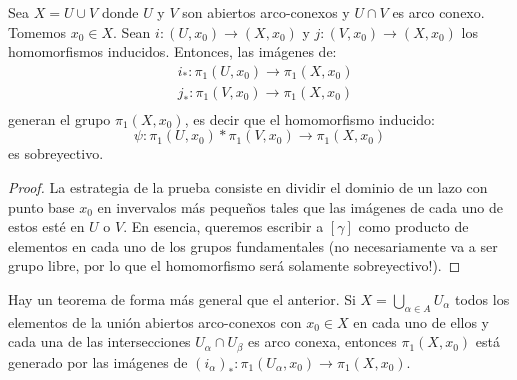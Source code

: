 \documentclass[12pt]{report}
\newcounter{it}
\theoremstyle{largebreak}
\newcommand\cf[3]{\ensuremath{#1:#2\rightarrow#3}}
\begin{document}
    \begin{propo}
        Sea $X=U\cup V$ donde $U$ y $V$ son abiertos arco-conexos y $U\cap V$ es arco conexo. Tomemos $x_0\in X$. Sean $\cf{i}{(U,x_0)}{(X,x_0)}$ y $\cf{j}{(V,x_0)}{(X,x_0)}$ los homomorfismos inducidos. Entonces, las imágenes de:
        \begin{equation*}
            \begin{split}
                &\cf{i_*}{\pi_1(U,x_0)}{\pi_1(X,x_0)}\\
                &\cf{j_*}{\pi_1(V,x_0)}{\pi_1(X,x_0)}\\
            \end{split}
        \end{equation*}
        generan el grupo $\pi_1(X,x_0)$, es decir que el homomorfismo inducido:
        \begin{equation*}
            \cf{\psi}{\pi_1(U,x_0)*\pi_1(V,x_0)}{\pi_1(X,x_0)}
        \end{equation*}
        es sobreyectivo.
    \end{propo}

    \begin{proof}
        La estrategia de la prueba consiste en dividir el dominio de un lazo con punto base $x_0$ en invervalos más pequeños tales que las imágenes de cada uno de estos esté en $U$ o $V$. En esencia, queremos escribir a $[\gamma]$ como producto de elementos en cada uno de los grupos fundamentales (no necesariamente va a ser grupo libre, por lo que el homomorfismo será solamente sobreyectivo!). 
    \end{proof}

    \begin{obs}
        Hay un teorema de forma más general que el anterior. Si $X=\bigcup_{\alpha\in A}U_\alpha$ todos los elementos de la unión abiertos arco-conexos con $x_0\in X$ en cada uno de ellos y cada una de las intersecciones $U_\alpha\cap U_\beta$ es arco conexa, entonces $\pi_1(X,x_0)$ está generado por las imágenes de $\cf{(i_\alpha)_*}{\pi_1(U_\alpha,x_0)}{\pi_1(X,x_0)}$.
    \end{obs}
\end{document}
